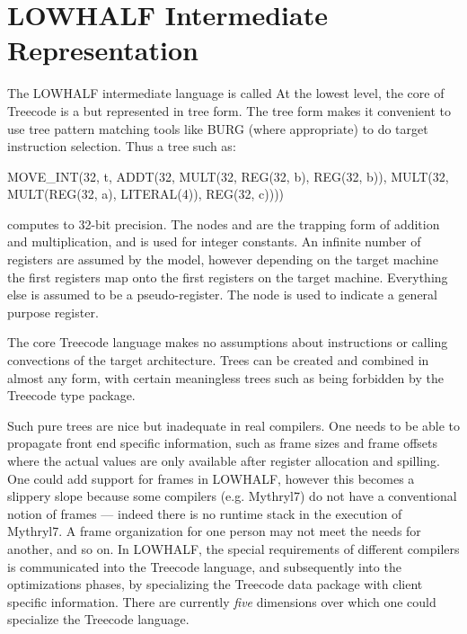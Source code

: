\section{LOWHALF Intermediate Representation}
   The LOWHALF intermediate language is called 
    At the lowest level, the core of Treecode is a 
   but represented in tree form. The tree
   form makes it convenient to use tree pattern matching tools like
   BURG (where appropriate) to do target instruction selection. Thus a
   tree such as: 

   \begin{SML}  
  MOVE_INT(32, t, 
     ADDT(32, MULT(32, REG(32, b), REG(32, b)),
              MULT(32, MULT(REG(32, a), LITERAL(4)), REG(32, c))))
   \end{SML}

   computes  to 32-bit precision. 
   The nodes  and
    are the trapping form of addition and multiplication,
   and  is used for integer constants. An infinite number
   of registers are assumed by the model, however depending on the
   target machine the first  registers map onto the first
    registers on the target machine. Everything else is
   assumed to be a pseudo-register. The  node is used to
   indicate a  general purpose register. 

   
   The core Treecode language makes no assumptions about instructions or
   calling convections of the target architecture. Trees can be
   created and combined in almost any form, with certain meaningless
   trees such as  being forbidden by the
   Treecode type package.

    Such pure trees are nice but inadequate in real compilers. One
   needs to be able to propagate front end specific information, such
   as frame sizes and frame offsets where the actual values are only
   available after register allocation and spilling. One could add
   support for frames in LOWHALF, however this becomes a slippery slope
   because some compilers (e.g. Mythryl7) do not have a conventional
   notion of frames --- indeed there is no runtime stack in the
   execution of Mythryl7. A frame organization for one person may not
   meet the needs for another, and so on.  In LOWHALF, the special
   requirements of different compilers is communicated into the Treecode
   language, and subsequently into the optimizations phases, by
   specializing the Treecode data package with client specific
   information. There are currently \emph{five} dimensions over
   which one could specialize the Treecode language.


